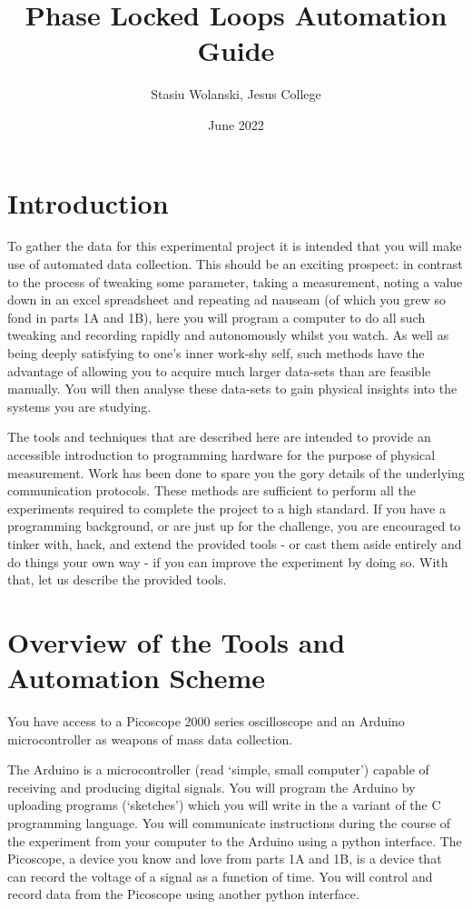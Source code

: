 \documentclass{article}
\title{Phase Locked Loops Automation Guide}
\author{Stasiu Wolanski, Jesus College}
\date{June 2022}
\begin{document}
\maketitle

\section{Introduction}
To gather the data for this experimental project it is intended that you will make use of automated data collection. This should be an exciting prospect: in contrast to the process of tweaking some parameter, taking a measurement, noting a value down in an excel spreadsheet and repeating ad nauseam (of which you grew so fond in parts 1A and 1B), here you will program a computer to do all such tweaking and recording rapidly and autonomously whilst you watch. As well as being deeply satisfying to one's inner work-shy self, such methods have the advantage of allowing you to acquire much larger data-sets than are feasible manually. You will then analyse these data-sets to gain physical insights into the systems you are studying.

The tools and techniques that are described here are intended to provide an accessible introduction to programming hardware for the purpose of physical measurement. Work has been done to spare you the gory details of the underlying communication protocols. These methods are sufficient to perform all the experiments required to complete the project to a high standard. If you have a programming background, or are just up for the challenge, you are encouraged to tinker with, hack, and extend the provided tools - or cast them aside entirely and do things your own way - if you can improve the experiment by doing so. With that, let us describe the provided tools.

\section{Overview of the Tools and Automation Scheme}
You have access to a Picoscope 2000 series oscilloscope and an Arduino microcontroller as weapons of mass data collection. 

The Arduino is a microcontroller (read `simple, small computer') capable of receiving and producing digital signals. You will program the Arduino by uploading programs (`sketches') which you will write in the a variant of the C programming language. You will communicate instructions during the course of the experiment from your computer to the Arduino using a python interface. The Picoscope, a device you know and love from parts 1A and 1B, is a device that can record the voltage of a signal as a function of time. You will control and record data from the Picoscope using another python interface.
\end{document}
